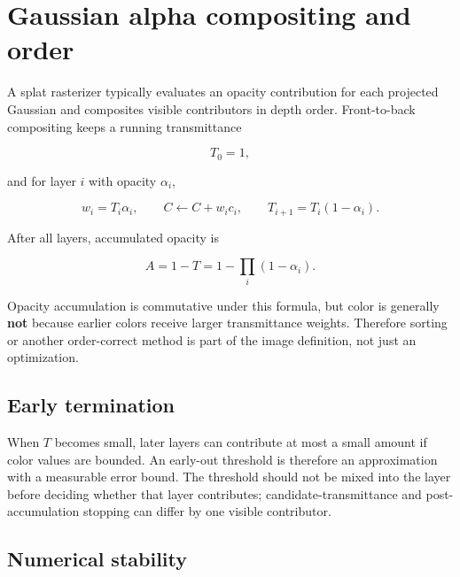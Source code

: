 \hypertarget{appendix-5f4b2e24c3f6}{}\label{referencestart:appendix-5f4b2e24c3f6}
\section{Gaussian alpha compositing and order}\label{appendix-5f4b2e24c3f6-gaussian-alpha-compositing-and-order}

\hypertarget{appendix-5f4b2e24c3f6-gaussian-alpha-compositing-and-order}{}

A splat rasterizer typically evaluates an opacity contribution for each projected Gaussian and composites visible contributors in depth order. Front-to-back compositing keeps a running transmittance

\[
T_0=1,
\]

and for layer \(i\) with opacity \(\alpha_i\),

\[
w_i=T_i\alpha_i,
\qquad
C \leftarrow C+w_i c_i,
\qquad
T_{i+1}=T_i(1-\alpha_i).
\]

After all layers, accumulated opacity is

\[
A=1-T
=
1-\prod_i(1-\alpha_i).
\]

Opacity accumulation is commutative under this formula, but color is generally \textbf{not} because earlier colors receive larger transmittance weights. Therefore sorting or another order-correct method is part of the image definition, not just an optimization.

\subsection{Early termination}\label{appendix-5f4b2e24c3f6-early-termination}

\hypertarget{appendix-5f4b2e24c3f6-early-termination}{}

When \(T\) becomes small, later layers can contribute at most a small amount if color values are bounded. An early-out threshold is therefore an approximation with a measurable error bound. The threshold should not be mixed into the layer before deciding whether that layer contributes; candidate-transmittance and post-accumulation stopping can differ by one visible contributor.

\subsection{Numerical stability}\label{appendix-5f4b2e24c3f6-numerical-stability}

\hypertarget{appendix-5f4b2e24c3f6-numerical-stability}{}

